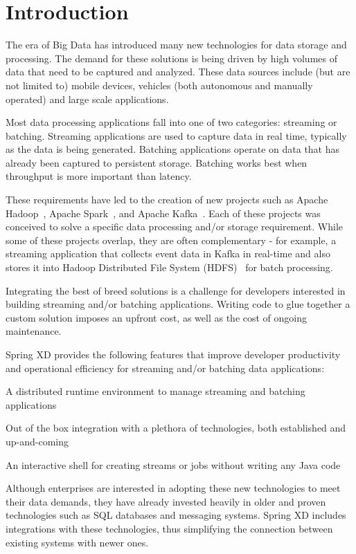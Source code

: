 \section{Introduction}

The era of Big Data has introduced many new technologies for data storage
and processing. The demand for these solutions is being driven by high
volumes of data that need to be captured and analyzed. These data sources
include (but are not limited to) mobile devices, vehicles (both autonomous
and manually operated) and large scale applications.

Most data processing applications fall into one of two categories:
streaming or batching. Streaming applications are used to capture data
in real time, typically as the data is being generated. Batching applications
operate on data that has already been captured to persistent storage. Batching
works best when throughput is more important than latency.

These requirements have led to the creation of new projects such as Apache Hadoop~\cite{hadoop},
Apache Spark~\cite{spark}, and Apache Kafka~\cite{kafka}. Each of these projects was conceived
to solve a specific data processing and/or storage requirement. While some
of these projects overlap, they are often complementary - for example,
a streaming application that collects event data in Kafka in real-time and also 
stores it into Hadoop Distributed File System (HDFS)~\cite{hdfs} for batch processing.

Integrating the best of breed solutions is a challenge for developers
interested in building streaming and/or batching applications. Writing
code to glue together a custom solution imposes an upfront cost,
as well as the cost of ongoing maintenance.

Spring XD provides the following features that improve developer
productivity and operational efficiency for streaming and/or batching
data applications:
\begin{itemize*}
\item A distributed runtime environment to manage streaming and batching applications
\item Out of the box integration with a plethora of technologies, both established
and up-and-coming
\item An interactive shell for creating streams or jobs without writing any Java code
\end{itemize*}

Although enterprises are interested in adopting these new technologies to
meet their data demands, they have already invested heavily in older and proven
technologies such as SQL databases and messaging systems. Spring XD includes
integrations with these technologies, thus simplifying the connection between
existing systems with newer ones.

